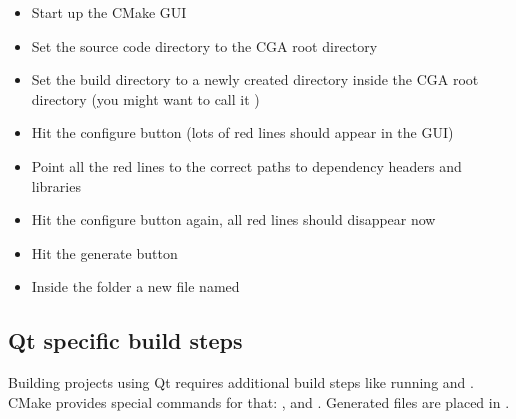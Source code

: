 \begin{itemize}
	\item Start up the CMake GUI
	\item Set the source code directory to the CGA root directory
    \item Set the build directory to a newly created directory inside the CGA root directory (you might want to call it )
    \item Hit the configure button (lots of red lines should appear in the GUI)
    \item Point all the red lines to the correct paths to dependency headers and libraries
    \item Hit the configure button again, all red lines should disappear now
    \item Hit the generate button
    \item Inside the  folder a new file named 
\end{itemize}



\subsection{Qt specific build steps} Building projects using Qt requires additional build steps like running  and . CMake provides special commands for that: ,  and . Generated files are placed in .
